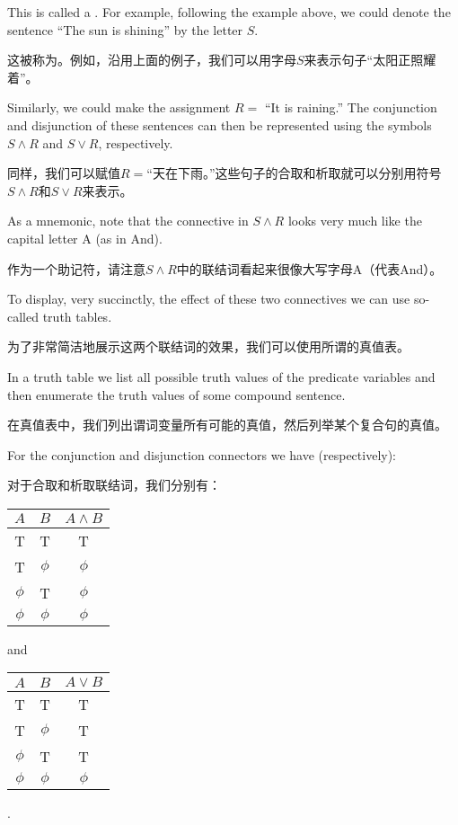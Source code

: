 This is called a .
For example, following the example above, we could denote the sentence
``The sun is shining'' by the letter $S$.

这被称为。例如，沿用上面的例子，我们可以用字母$S$来表示句子“太阳正照耀着”。

Similarly, we could make the
assignment $R =$ ``It is raining.''   The conjunction and disjunction 
of these sentences can then be represented using the symbols $S \land R$
and $S \lor R$, respectively.

同样，我们可以赋值$R=$“天在下雨。”这些句子的合取和析取就可以分别用符号$S \land R$和$S \lor R$来表示。

As a mnemonic, note that the connective
in $S \land R$ looks very much like the capital letter A (as in And).

作为一个助记符，请注意$S \land R$中的联结词看起来很像大写字母A（代表And）。

To display, very succinctly, the effect of these two connectives we can
use so-called truth tables.

为了非常简洁地展示这两个联结词的效果，我们可以使用所谓的真值表。

In a truth table we list 
all possible truth 
values of the predicate variables and then enumerate the truth values 
of some compound sentence.

在真值表中，我们列出谓词变量所有可能的真值，然后列举某个复合句的真值。

For the conjunction and disjunction
connectors we have (respectively):

对于合取和析取联结词，我们分别有：

\begin{center}
\begin{tabular}{c|c||c}
\; $A$ \; & \; $B$ \; & \; $A \land B$ \; \\ \hline
T & T & T \\
T & $\phi$ & $\phi$\\
 $\phi$ & T & $\phi$\\
 $\phi$ &  $\phi$ & $\phi$\\
\end{tabular}
\hspace{.25in}and\hspace{.25in}
\begin{tabular}{c|c||c}
\; $A$ \; & \; $B$ \; & \; $A \lor B$ \; \\ \hline
T & T & T \\
T & $\phi$ & T\\
 $\phi$ & T & T\\
 $\phi$ &  $\phi$ & $\phi$\\
\end{tabular}.
\end{center}

